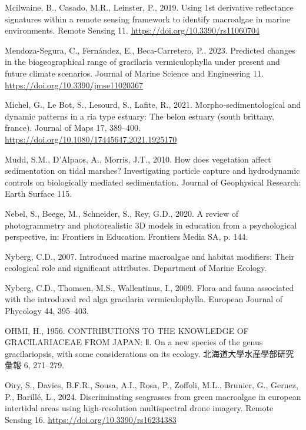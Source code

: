\documentclass[
  letterpaper,
  DIV=11,
  numbers=noendperiod]{scrartcl}
\newlength{\cslhangindent}
\newenvironment{CSLReferences}[2] %
 {\begin{list}{}{%
  \setlength{\itemindent}{0pt}
  \setlength{\leftmargin}{0pt}
  \setlength{\parsep}{0pt}
  \ifodd #1
   \setlength{\leftmargin}{\cslhangindent}
   \setlength{\itemindent}{-1\cslhangindent}
  \fi
  \setlength{\itemsep}{#2\baselineskip}}}
 {\end{list}}
\begin{document}
\begin{CSLReferences}{1}{0}
Mcilwaine, B., Casado, M.R., Leinster, P., 2019. Using 1st derivative
reflectance signatures within a remote sensing framework to identify
macroalgae in marine environments. Remote Sensing 11.
\url{https://doi.org/10.3390/rs11060704}

Mendoza-Segura, C., Fernández, E., Beca-Carretero, P., 2023. Predicted
changes in the biogeographical range of gracilaria vermiculophylla under
present and future climate scenarios. Journal of Marine Science and
Engineering 11. \url{https://doi.org/10.3390/jmse11020367}

Michel, G., Le Bot, S., Lesourd, S., Lafite, R., 2021.
Morpho-sedimentological and dynamic patterns in a ria type estuary: The
belon estuary (south brittany, france). Journal of Maps 17, 389--400.
\url{https://doi.org/10.1080/17445647.2021.1925170}

Mudd, S.M., D'Alpaos, A., Morris, J.T., 2010. How does vegetation affect
sedimentation on tidal marshes? Investigating particle capture and
hydrodynamic controls on biologically mediated sedimentation. Journal of
Geophysical Research: Earth Surface 115.

Nebel, S., Beege, M., Schneider, S., Rey, G.D., 2020. A review of
photogrammetry and photorealistic 3D models in education from a
psychological perspective, in: Frontiers in Education. Frontiers Media
SA, p. 144.

Nyberg, C.D., 2007. Introduced marine macroalgae and habitat modifiers:
Their ecological role and significant attributes. Department of Marine
Ecology.

Nyberg, C.D., Thomsen, M.S., Wallentinus, I., 2009. Flora and fauna
associated with the introduced red alga gracilaria vermiculophylla.
European Journal of Phycology 44, 395--403.

OHMI, H., 1956. CONTRIBUTIONS TO THE KNOWLEDGE OF GRACILARIACEAE FROM
JAPAN: Ⅱ. On a new species of the genus gracilariopsis, with some
considerations on its ecology. 北海道大學水産學部研究彙報 6, 271--279.

Oiry, S., Davies, B.F.R., Sousa, A.I., Rosa, P., Zoffoli, M.L., Brunier,
G., Gernez, P., Barillé, L., 2024. Discriminating seagrasses from green
macroalgae in european intertidal areas using high-resolution
multispectral drone imagery. Remote Sensing 16.
\url{https://doi.org/10.3390/rs16234383}


\end{CSLReferences}
\end{document}
